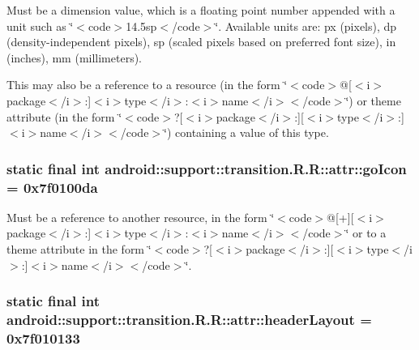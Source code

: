 Must be a dimension value, which is a floating point number appended with a unit such as \char`\"{}$<$code$>$14.5sp$<$/code$>$\char`\"{}. Available units are: px (pixels), dp (density-independent pixels), sp (scaled pixels based on preferred font size), in (inches), mm (millimeters). 

This may also be a reference to a resource (in the form \char`\"{}$<$code$>$@\mbox{[}$<$i$>$package$<$/i$>$:\mbox{]}$<$i$>$type$<$/i$>$:$<$i$>$name$<$/i$>$$<$/code$>$\char`\"{}) or theme attribute (in the form \char`\"{}$<$code$>$?\mbox{[}$<$i$>$package$<$/i$>$:\mbox{]}\mbox{[}$<$i$>$type$<$/i$>$:\mbox{]}$<$i$>$name$<$/i$>$$<$/code$>$\char`\"{}) containing a value of this type. \hypertarget{classandroid_1_1support_1_1transition_1_1_r_1_1attr_824c5eeb6011ff1ec4840a8186815dd6}{
\subsubsection[{goIcon}]{\setlength{\rightskip}{0pt plus 5cm}static final int android::support::transition.R.R::attr::goIcon = 0x7f0100da}}
\label{classandroid_1_1support_1_1transition_1_1_r_1_1attr_824c5eeb6011ff1ec4840a8186815dd6}


Must be a reference to another resource, in the form \char`\"{}$<$code$>$@\mbox{[}+\mbox{]}\mbox{[}$<$i$>$package$<$/i$>$:\mbox{]}$<$i$>$type$<$/i$>$:$<$i$>$name$<$/i$>$$<$/code$>$\char`\"{} or to a theme attribute in the form \char`\"{}$<$code$>$?\mbox{[}$<$i$>$package$<$/i$>$:\mbox{]}\mbox{[}$<$i$>$type$<$/i$>$:\mbox{]}$<$i$>$name$<$/i$>$$<$/code$>$\char`\"{}. \hypertarget{classandroid_1_1support_1_1transition_1_1_r_1_1attr_95312953e5de98f99270443e0de24c2a}{
\subsubsection[{headerLayout}]{\setlength{\rightskip}{0pt plus 5cm}static final int android::support::transition.R.R::attr::headerLayout = 0x7f010133}}
\label{classandroid_1_1support_1_1transition_1_1_r_1_1attr_95312953e5de98f99270443e0de24c2a}


